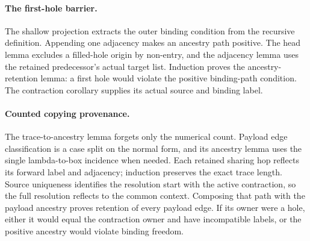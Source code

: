 
\paragraph{The first-hole barrier.}
The shallow projection extracts the outer binding condition from the
recursive definition. Appending one adjacency makes an ancestry path
positive. The head lemma excludes a filled-hole origin by non-entry, and
the adjacency lemma uses the retained predecessor's actual target list.
Induction proves the ancestry-retention lemma: a first hole would violate
the positive binding-path condition. The contraction corollary supplies
its actual source and binding label.

\par{}

\paragraph{Counted copying provenance.}
The trace-to-ancestry lemma forgets only the numerical count. Payload
edge classification is a case split on the normal form, and its ancestry
lemma uses the single lambda-to-box incidence when needed. Each retained
sharing hop reflects its forward label and adjacency; induction preserves
the exact trace length. Source uniqueness identifies the resolution start
with the active contraction, so the full resolution reflects to the common
context. Composing that path with the payload ancestry proves retention
of every payload edge. If its owner were a hole, either it would equal the
contraction owner and have incompatible labels, or the positive ancestry
would violate binding freedom.

\par{}

